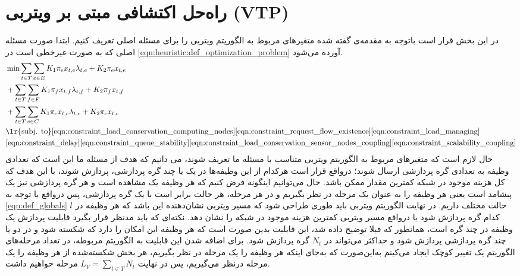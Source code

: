 \section{راه‌حل اکتشافی مبتی بر ویتربی (VTP)}	\label{subsection:vtp}
در این بخش قرار است باتوجه به مقدمه‌ی گفته شده متغیرهای مربوط به الگوریتم ویتربی را برای مسئله اصلی تعریف کنیم. 
ابتدا صورت مسئله اصلی که به صورت غیرخطی است در \cref{eqn:heuristic:def_optimization_problem} آورده می‌شود. 
\begin{align}\label{eqn:heuristic:def_optimization_problem}
	& \min \sum_{t \in T}\sum_{e \in E} K_1\pi_ex_{t,e}\lambda_{t,e} + K_2\pi_ex_{t,e} \notag \\
	& + \sum_{t \in T}\sum_{f \in F} K_1\pi_fx_{t,f}\lambda_{t,f} + K_2\pi_fx_{t,f} \notag \\
	& + \sum_{t \in T}\sum_{c \in C} K_1\pi_cx_{t,c}\lambda_{t,c} + K_2\pi_cx_{t,c} \notag \\
	&\text{\lr{subj. to}}  %
	\cref{eqn:constraint_load_conservation_computing_nodes}
	\cref{eqn:constraint_request_flow_existence}
	\cref{eqn:constraint_load_managing}\notag \\
	&\cref{eqn:constraint_delay}
	\cref{eqn:constraint_queue_stability}
	\cref{eqn:constraint_load_conservation_sensor_nodes_coupling}
	\cref{eqn:constraint_scalability_coupling}
\end{align}
حال لازم است که متغیرهای مربوط به الگوریتم ویتربی متناسب با مسئله‌ ما تعریف شوند، می دانیم که هدف از مسئله ما این است که تعدادی وظیفه به تعدادی گره پردازشی ارسال شوند؛ درواقع قرار است هرکدام از این وظیفه‌ها در یک یا چند گره پردازشی، پردازش شوند، با این هدف که کل هزینه موجود در شبکه کمترین مقدار ممکن باشد. حال می‌توانیم اینگونه فرض کنیم که هر وظیفه یک مشاهده است و هر گره پردازشی نیز یک پیشامد است یعنی هر وظیفه را به عنوان یک مرحله در نظر بگیریم و در هر مرحله، هر حالت برابر است با یک گره پردازشی، پس درواقع با توجه به \cref{eqn:def_globals} $l$ حالت مختلف داریم. در نهایت الگوریتم ویتربی باید طوری طراحی شود که مسیر ویتربی نشان‌دهنده این باشد که هر وظیفه در کدام گره پردازش شود یا درواقع مسیر ویتربی کمترین هزینه موجود در شبکه را نشان دهد.
نکته‌ای که باید مدنظر قرار بگیرد قابلیت پردازش یک وظیفه در چند گره است، همانطور که قبلا توضیح داده شد، این قابلیت بدین صورت است که هر وظیفه این امکان را دارد که شکسته شود و در دو یا چند گره پردازشی پردازش شود و حداکثر می‌تواند در $N_t$ گره پردازش شود. 
برای اضافه شدن این قابلیت به الگوریتم مربوطه، در تعداد مرحله‌های الگوریتم یک تغییر کوچک ایجاد می‌کینم به‌این‌صورت که به‌جای اینکه هر وظیفه را یک مرحله در نظر بگیریم، هر بخش شکسته‌شده از هر وظیفه را یک مرحله درنظر می‌گیریم، پس در نهایت $ \displaystyle L_V=\sum_{t \in T} N_t$ مرحله خواهیم داشت. 
